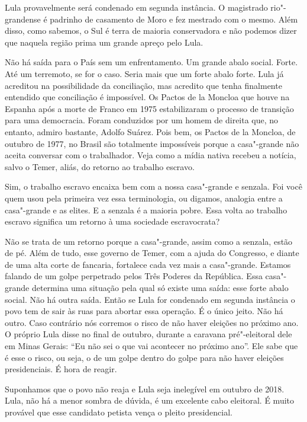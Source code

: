 \falaG Lula provavelmente será condenado em segunda instância. O magistrado
rio"-grandense é padrinho de casamento de Moro e fez mestrado com o
mesmo. Além disso, como sabemos, o Sul é terra de maioria conservadora e
não podemos dizer que naquela região prima um grande apreço pelo Lula.

\falaM Não há saída para o País sem um enfrentamento. Um grande abalo
social. Forte. Até um terremoto, se for o caso. Seria mais que um forte
abalo forte. Lula já acreditou na possibilidade da conciliação, mas
acredito que tenha finalmente entendido que conciliação é impossível. Os
Pactos de la Moncloa que houve na Espanha após a morte de Franco em 1975
estabilizaram o processo de transição para uma democracia. Foram
conduzidos por um homem de direita que, no entanto, admiro bastante,
Adolfo Suárez. Pois bem, os Pactos de la Moncloa, de outubro de 1977, no
Brasil são totalmente impossíveis porque a casa"-grande não aceita
conversar com o trabalhador. Veja como a mídia nativa recebeu a notícia,
salvo o Temer, aliás, do retorno ao trabalho escravo.

\falaG Sim, o trabalho escravo encaixa bem com a nossa casa"-grande e
senzala. Foi você quem usou pela primeira vez essa terminologia, ou
digamos, analogia entre a casa"-grande e as elites. E a senzala é a
maioria pobre. Essa volta ao trabalho escravo significa um retorno à uma
sociedade escravocrata?

\falaM Não se trata de um retorno porque a casa"-grande, assim como a
senzala, estão de pé. Além de tudo, esse governo de Temer, com a ajuda
do Congresso, e diante de uma alta corte de fancaria, fortalece cada vez
mais a casa"-grande. Estamos falando de um golpe perpetrado pelos Três
Poderes da República. Essa casa"-grande determina uma situação pela qual
só existe uma saída: esse forte abalo social. Não há outra saída. Então
se Lula for condenado em segunda instância o povo tem de sair às ruas
para abortar essa operação. É o único jeito. Não há outro. Caso
contrário nós corremos o risco de não haver eleições no próximo ano. O
próprio Lula disse no final de outubro, durante a caravana pré"-eleitoral
dele em Minas Gerais: ``Eu não sei o que vai acontecer no próximo ano''.
Ele sabe que é esse o risco, ou seja, o de um golpe dentro do golpe para
não haver eleições presidenciais. É hora de reagir.

\falaG Suponhamos que o povo não reaja e Lula seja inelegível em outubro de
2018. Lula, não há a menor sombra de dúvida, é um excelente cabo
eleitoral. É muito provável que esse candidato petista vença o pleito
presidencial.


